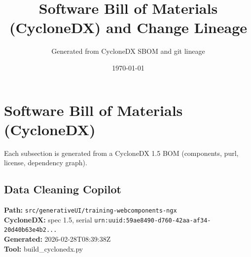 \documentclass[11pt]{article}
\title{Software Bill of Materials (CycloneDX) and Change Lineage}
\author{Generated from CycloneDX SBOM and git lineage}
\date{\today}
\begin{document}
\maketitle
\tableofcontents
\newpage
\section{Software Bill of Materials (CycloneDX)}
Each subsection is generated from a CycloneDX 1.5 BOM (components, purl, license, dependency graph).

\subsection{Data Cleaning Copilot}
\textbf{Path:} \texttt{src/generativeUI/training-webcomponents-ngx}
\\ \textbf{CycloneDX:} spec 1.5, serial \texttt{urn:uuid:59ae8490-d760-42aa-af34-20d40b63e4b2...}
\\ \textbf{Generated:} 2026-02-28T08:39:38Z
\\ \textbf{Tool:} build\_cyclonedx.py
\end{document}
